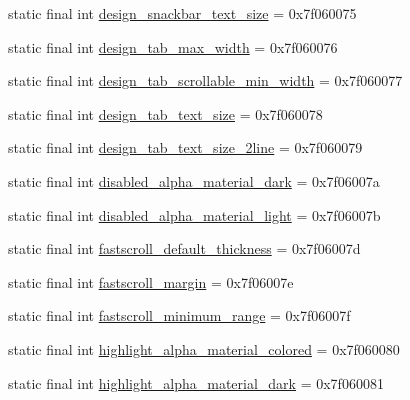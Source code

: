 \begin{DoxyCompactItemize}
\item 
static final int \mbox{\hyperlink{classandroid_1_1support_1_1design_1_1R_1_1dimen_a52aa6de59674be234038a285bd18813e}{design\+\_\+snackbar\+\_\+text\+\_\+size}} = 0x7f060075
\item 
static final int \mbox{\hyperlink{classandroid_1_1support_1_1design_1_1R_1_1dimen_a5b6cc64ba88e605a0388ebbfe495d251}{design\+\_\+tab\+\_\+max\+\_\+width}} = 0x7f060076
\item 
static final int \mbox{\hyperlink{classandroid_1_1support_1_1design_1_1R_1_1dimen_a2edb69ba3cb024d1d650c6a62f96628e}{design\+\_\+tab\+\_\+scrollable\+\_\+min\+\_\+width}} = 0x7f060077
\item 
static final int \mbox{\hyperlink{classandroid_1_1support_1_1design_1_1R_1_1dimen_aedbcd9d0b778f601a43eefd313738afa}{design\+\_\+tab\+\_\+text\+\_\+size}} = 0x7f060078
\item 
static final int \mbox{\hyperlink{classandroid_1_1support_1_1design_1_1R_1_1dimen_a3c5c3229ecd1ba7f583b2aaf0ceb820f}{design\+\_\+tab\+\_\+text\+\_\+size\+\_\+2line}} = 0x7f060079
\item 
static final int \mbox{\hyperlink{classandroid_1_1support_1_1design_1_1R_1_1dimen_abaf724b0a152c084b87b3a250eb9925e}{disabled\+\_\+alpha\+\_\+material\+\_\+dark}} = 0x7f06007a
\item 
static final int \mbox{\hyperlink{classandroid_1_1support_1_1design_1_1R_1_1dimen_a5ff754097768daa1ae8597556ab0a5a5}{disabled\+\_\+alpha\+\_\+material\+\_\+light}} = 0x7f06007b
\item 
static final int \mbox{\hyperlink{classandroid_1_1support_1_1design_1_1R_1_1dimen_aad2d8c6dd6e7367440c05d0a478b4520}{fastscroll\+\_\+default\+\_\+thickness}} = 0x7f06007d
\item 
static final int \mbox{\hyperlink{classandroid_1_1support_1_1design_1_1R_1_1dimen_a20f52cacfc95f159caad4d48307c9c0c}{fastscroll\+\_\+margin}} = 0x7f06007e
\item 
static final int \mbox{\hyperlink{classandroid_1_1support_1_1design_1_1R_1_1dimen_a793c85c872de5a1c75da36ee72d86c9e}{fastscroll\+\_\+minimum\+\_\+range}} = 0x7f06007f
\item 
static final int \mbox{\hyperlink{classandroid_1_1support_1_1design_1_1R_1_1dimen_a844066f047b47ae2ef832ac7e8ece4c2}{highlight\+\_\+alpha\+\_\+material\+\_\+colored}} = 0x7f060080
\item 
static final int \mbox{\hyperlink{classandroid_1_1support_1_1design_1_1R_1_1dimen_ad4138b2c901c676ceb97b62ece7c5bad}{highlight\+\_\+alpha\+\_\+material\+\_\+dark}} = 0x7f060081

\end{DoxyCompactItemize}
